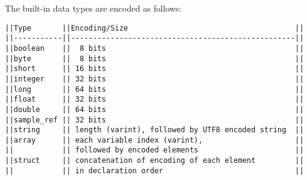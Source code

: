 \documentclass[a4paper]{article}
\begin{document}
The built-in data types are encoded as follows:
\begin{lstlisting}[basicstyle=\footnotesize\ttfamily]
||Type       ||Encoding/Size                                      ||
||-----------||---------------------------------------------------||
||boolean    ||  8 bits                                           ||
||byte       ||  8 bits                                           ||
||short      || 16 bits                                           ||
||integer    || 32 bits                                           ||
||long       || 64 bits                                           ||
||float      || 32 bits                                           ||
||double     || 64 bits                                           ||
||sample_ref || 32 bits                                           ||
||string     || length (varint), followed by UTF8 encoded string  ||
||array      || each variable index (varint),                     ||
||           || followed by encoded elements                      ||
||struct     || concatenation of encoding of each element         ||
||           || in declaration order                              ||
\end{lstlisting}
\pagebreak
\end{document}
